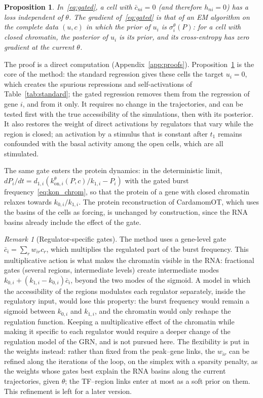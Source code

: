 \documentclass[a4paper, 11pt]{article}
\newcommand{\koni}{k_{\mathrm{on},i}^{\theta}}
\newcommand{\cbar}{\bar c}
\theoremstyle{plain}
\newtheorem{prop}{Proposition}
\theoremstyle{remark}
\newtheorem{rem}{Remark}
\begin{document}
\begin{prop}\label{prop:gated}
In~\eqref{eq:gated}, a cell with $\cbar_{ni} = 0$ (and therefore $h_{ni} = 0$) has a loss independent of $\theta$. The gradient of~\eqref{eq:gated} is that of an EM algorithm on the complete data $(u, c)$ in which the prior of $u_i$ is $\sigma_i^\theta(P)$: for a cell with closed chromatin, the posterior of $u_i$ is its prior, and its cross-entropy has zero gradient at the current $\theta$.
\end{prop}

The proof is a direct computation (Appendix~\ref{app:proofs}). Proposition~\ref{prop:gated} is the core of the method: the standard regression gives these cells the target $u_i = 0$, which creates the spurious repressions and self-activations of Table~\ref{tab:standard}; the gated regression removes them from the regression of gene $i$, and from it only. It requires no change in the trajectories, and can be tested first with the true accessibility of the simulations, then with its posterior. It also restores the weight of direct activations by regulators that vary while the region is closed; an activation by a stimulus that is constant after $t_1$ remains confounded with the basal activity among the open cells, which are all stimulated.

The same gate enters the protein dynamics: in the deterministic limit, $dP_i/dt = d_{1,i}(\koni(P, c)/k_{1,i} - P_i)$ with the gated burst frequency~\eqref{eq:kon_chrom}, so that the protein of a gene with closed chromatin relaxes towards $k_{0,i}/k_{1,i}$. The protein reconstruction of CardamomOT, which uses the basins of the cells as forcing, is unchanged by construction, since the RNA basins already include the effect of the gate.

\begin{rem}[Regulator-specific gates]\label{rem:regspecific}
The method uses a gene-level gate $\cbar_i = \sum_r w_{ir} c_r$, which multiplies the regulated part of the burst frequency. This multiplicative action is what makes the chromatin visible in the RNA: fractional gates (several regions, intermediate levels) create intermediate modes $k_{0,i} + (k_{1,i} - k_{0,i})\cbar_i$, beyond the two modes of the sigmoid. A model in which the accessibility of the regions modulates each regulator separately, inside the regulatory input, would lose this property: the burst frequency would remain a sigmoid between $k_{0,i}$ and $k_{1,i}$, and the chromatin would only reshape the regulation function. Keeping a multiplicative effect of the chromatin while making it specific to each regulator would require a deeper change of the regulation model of the GRN, and is not pursued here. The flexibility is put in the weights instead: rather than fixed from the peak--gene links, the $w_{ir}$ can be refined along the iterations of the loop, on the simplex with a sparsity penalty, as the weights whose gates best explain the RNA basins along the current trajectories, given $\theta$; the TF--region links enter at most as a soft prior on them. This refinement is left for a later version.
\end{rem}
\end{document}
